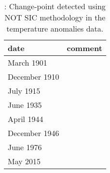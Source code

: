 \begin{table}[ht]
\centering
\begin{tabular}{ll}
  \hline
date & comment \\ 
  \hline
March 1901 &  \\ 
  December 1910 &  \\ 
  July 1915 &  \\ 
  June 1935 &  \\ 
  April 1944 &  \\ 
  December 1946 &  \\ 
  June 1976 &  \\ 
  May 2015 &  \\ 
   \hline
\end{tabular}
\caption{\label{Table:temp_anomalies_changepoints}: Change-point detected using NOT SIC methodology in the temperature anomalies data.} 
\end{table}
